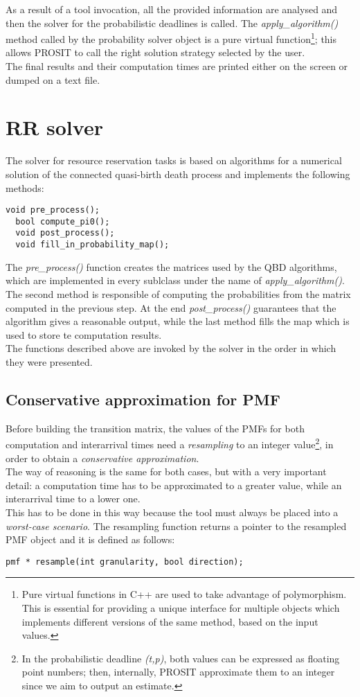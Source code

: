 As a result of a tool invocation, all the provided information are analysed and then the solver for the probabilistic deadlines is called. The \emph{apply\_algorithm()} method called by the probability solver object is a pure virtual function\footnote{Pure virtual functions in C++ are used to take advantage of polymorphism. This is essential for providing a unique interface for multiple objects which implements different versions of the same method, based on the input values.}; this allows PROSIT to call the right solution strategy selected by the user.\\
The final results and their computation times are printed either on the screen or dumped on a text file.

\section{RR solver}
The solver for resource reservation tasks is based on algorithms for a numerical solution of the connected quasi-birth death process and implements the following methods:
\begin{lstlisting}[frame=bt]
  void pre_process();
  bool compute_pi0();
  void post_process();
  void fill_in_probability_map();
\end{lstlisting}
The \emph{pre\_process()} function creates the matrices used by the QBD algorithms, which are implemented in every sublclass under the name of \emph{apply\_algorithm()}. The second method is responsible of computing the probabilities from the matrix computed in the previous step. At the end \emph{post\_process()} guarantees that the algorithm gives a reasonable output, while the last method fills the map which is used to store te computation results.\\
The functions described above are invoked by the solver in the order in which they were presented.

\subsection{Conservative approximation for PMF}
Before building the transition matrix, the values of the PMFs for both computation and interarrival times need a \emph{resampling} to an integer value\footnote{In the probabilistic deadline \emph{(t,p)}, both values can be expressed as floating point numbers; then, internally, PROSIT approximate them to an integer since we aim to output an estimate.}, in order to obtain a \emph{conservative approximation}.\\
The way of reasoning is the same for both cases, but with a very important detail: a computation time has to be approximated to a greater value, while an interarrival time to a lower one.\\ 
This has to be done in this way because the tool must always be placed into a \emph{worst-case scenario}. The resampling function returns a pointer to the resampled PMF object and it is defined as follows:
\begin{lstlisting}[frame=bt]
  pmf * resample(int granularity, bool direction);
\end{lstlisting}

